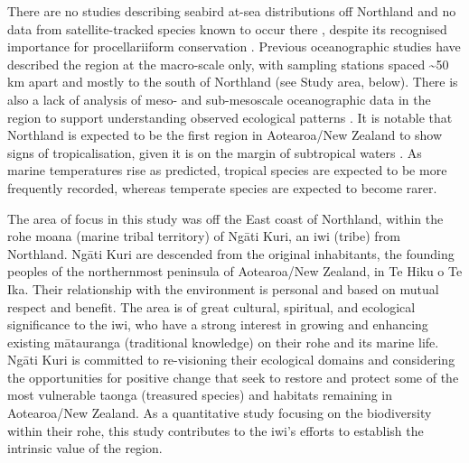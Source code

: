 \documentclass[preprint, 3p, authoryear]{elsarticle} %
\begin{document}
There are no studies describing seabird at-sea distributions off Northland \citep{mott2018} and no data from satellite-tracked species known to occur there \citep{bernard2021, carneiro2024}, despite its recognised importance for procellariiform conservation \citep{chown1998, beal2021}. Previous oceanographic studies have described the region at the macro-scale only, with sampling stations spaced \textasciitilde50 km apart and mostly to the south of Northland (see Study area, below). There is also a lack of analysis of meso- and sub-mesoscale oceanographic data in the region to support understanding observed ecological patterns \citep[but see][]{dellapenna2021}. It is notable that Northland is expected to be the first region in Aotearoa/New Zealand to show signs of tropicalisation, given it is on the margin of subtropical waters \citep{zarzyczny2024}. As marine temperatures rise as predicted, tropical species are expected to be more frequently recorded, whereas temperate species are expected to become rarer.

The area of focus in this study was off the East coast of Northland, within the rohe moana (marine tribal territory) of Ng\={a}ti Kuri, an iwi (tribe) from Northland. Ng\={a}ti Kuri are descended from the original inhabitants, the founding peoples of the northernmost peninsula of Aotearoa/New Zealand, in Te Hiku o Te Ika. Their relationship with the environment is personal and based on mutual respect and benefit. The area is of great cultural, spiritual, and ecological significance to the iwi, who have a strong interest in growing and enhancing existing m\={a}tauranga (traditional knowledge) on their rohe and its marine life. Ng\={a}ti Kuri is committed to re-visioning their ecological domains and considering the opportunities for positive change that seek to restore and protect some of the most vulnerable taonga (treasured species) and habitats remaining in Aotearoa/New Zealand. As a quantitative study focusing on the biodiversity within their rohe, this study contributes to the iwi's efforts to establish the intrinsic value of the region.
\end{document}
